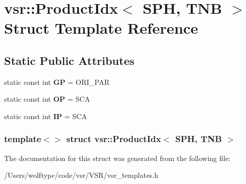 \hypertarget{structvsr_1_1_product_idx_3_01_s_p_h_00_01_t_n_b_01_4}{\section{vsr\-:\-:Product\-Idx$<$ S\-P\-H, T\-N\-B $>$ Struct Template Reference}
\label{structvsr_1_1_product_idx_3_01_s_p_h_00_01_t_n_b_01_4}
}
\subsection*{Static Public Attributes}
\begin{DoxyCompactItemize}
\item 
\hypertarget{structvsr_1_1_product_idx_3_01_s_p_h_00_01_t_n_b_01_4_a4a1ca9b2fc966bb278435f6cc6756059}{static const int {\bfseries G\-P} = O\-R\-I\-\_\-\-P\-A\-R}\label{structvsr_1_1_product_idx_3_01_s_p_h_00_01_t_n_b_01_4_a4a1ca9b2fc966bb278435f6cc6756059}

\item 
\hypertarget{structvsr_1_1_product_idx_3_01_s_p_h_00_01_t_n_b_01_4_ae1f8b45d46f0220de0f2f4d204c96e24}{static const int {\bfseries O\-P} = S\-C\-A}\label{structvsr_1_1_product_idx_3_01_s_p_h_00_01_t_n_b_01_4_ae1f8b45d46f0220de0f2f4d204c96e24}

\item 
\hypertarget{structvsr_1_1_product_idx_3_01_s_p_h_00_01_t_n_b_01_4_a9f789a332285ebf4202e17a2f832b5e9}{static const int {\bfseries I\-P} = S\-C\-A}\label{structvsr_1_1_product_idx_3_01_s_p_h_00_01_t_n_b_01_4_a9f789a332285ebf4202e17a2f832b5e9}

\end{DoxyCompactItemize}
\subsubsection*{template$<$$>$ struct vsr\-::\-Product\-Idx$<$ S\-P\-H, T\-N\-B $>$}



The documentation for this struct was generated from the following file\-:\begin{DoxyCompactItemize}
\item 
/\-Users/wolftype/code/vsr/\-V\-S\-R/vsr\-\_\-templates.\-h\end{DoxyCompactItemize}

